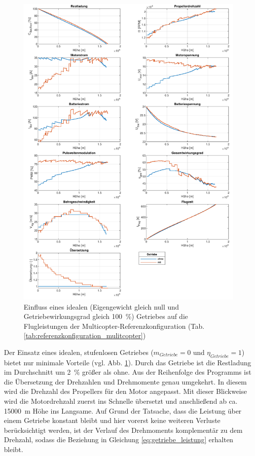 \begin{figure}[H]
\centering
	\includegraphics[scale=0.7]{Diagramme/Getriebe.pdf}
	\caption{Einfluss eines idealen (Eigengewicht gleich null und Getriebewirkungsgrad gleich \SI{100}{\%}) Getriebes auf die Flugleistungen der Multicopter-Referenzkonfiguration (Tab. \ref{tab:referenzkonfiguration_mulitcopter})}
	\label{abb:getriebe}
\end{figure}
Der Einsatz eines idealen, stufenlosen Getriebes (\ensuremath{m_{Getriebe} = 0} und \ensuremath{\eta_{Getriebe} = 1}) bietet nur minimale Vorteile (vgl. Abb. \ref{abb:getriebe}). Durch das Getriebe ist die Restladung im Durchschnitt um \SI{2}{\%} größer als ohne. Aus der Reihenfolge des Programms ist die Übersetzung der Drehzahlen und Drehmomente genau umgekehrt. In diesem wird die Drehzahl des Propellers für den Motor angepasst. Mit dieser Blickweise wird die Motordrehzahl zuerst ins Schnelle übersetzt und anschließend ab ca. \SI{15000}{m} Höhe ins Langsame. Auf Grund der Tatsache, dass die Leistung über einem Getriebe konstant bleibt und hier vorerst keine weiteren Verluste berücksichtigt werden, ist der Verlauf des Drehmoments komplementär zu dem Drehzahl, sodass die Beziehung in Gleichung \eqref{eq:getriebe_leistung} erhalten bleibt. \\

